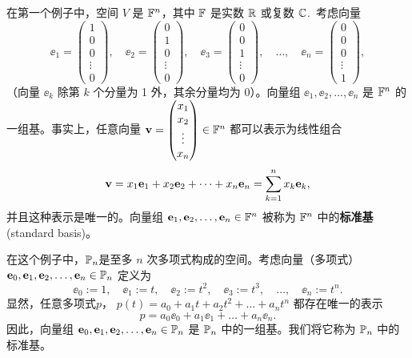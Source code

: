 \begin{example}\label{stmt:01-02-02}
在第一个例子中，空间 ${V}$ 是 $\mathbb{F}^n$，其中 $\mathbb{F}$ 是实数 $\mathbb{R}$ 或复数 $\mathbb{C}$.~考虑向量
$$ \ee_1 = \begin{pmatrix} 1 \\ 0 \\ 0 \\ \vdots \\ 0 \end{pmatrix}, \quad \ee_2 = \begin{pmatrix} 0 \\ 1 \\ 0 \\ \vdots \\ 0 \end{pmatrix}, \quad \ee_3 = \begin{pmatrix} 0 \\ 0 \\ 1 \\ \vdots \\ 0 \end{pmatrix}, \quad \dots, \quad \ee_n = \begin{pmatrix} 0 \\ 0 \\ 0 \\ \vdots \\ 1 \end{pmatrix} ,$$
（向量 $\ee_k$ 除第 $k$ 个分量为 1 外，其余分量均为 0）。向量组 $\ee_1, \ee_2, \dots, \ee_n$ 是 $\mathbb{F}^n$ 的一组基。事实上，任意向量 $\mathbf{v} = \begin{pmatrix} x_1 \\ x_2 \\ \vdots \\ x_n \end{pmatrix} \in \mathbb{F}^n$ 都可以表示为线性组合
$$ \mathbf{v} = x_1 \mathbf{e}_1 + x_2 \mathbf{e}_2 + \dots + x_n \mathbf{e}_n = \sum_{k=1}^n x_k \mathbf{e}_k ,$$
并且这种表示是唯一的。向量组 $\mathbf{e}_1, \mathbf{e}_2, \dots, \mathbf{e}_n \in \mathbb{F}^n$ 被称为 $\mathbb{F}^n$ 中的\textbf{标准基}(standard basis)。
\end{example}


\begin{example}\label{stmt:01-02-03}
在这个例子中，$\mathbb{P}_n$是至多 $n$ 次多项式构成的空间。考虑向量（多项式） $\mathbf{e}_0, \mathbf{e}_1, \mathbf{e}_2, \dots, \mathbf{e}_n \in \mathbb{P}_n$ 定义为
$$ \ee_0 := 1, \quad \ee_1 := t, \quad \ee_2 := t^2, \quad \ee_3 := t^3, \quad \dots, \quad \ee_n := t^n .$$
显然，任意多项式$p$， $p(t) = a_0 + a_1 t + a_2 t^2 + \dots + a_n t^n$ 都存在唯一的表示
$$ p = a_0 \ee_0 + a_1 \ee_1 + \dots + a_n \ee_n .$$
因此，向量组 $\mathbf{e}_0, \mathbf{e}_1, \mathbf{e}_2, \dots, \mathbf{e}_n \in \mathbb{P}_n$ 是 $\mathbb{P}_n$ 中的一组基。我们将它称为 $\mathbb{P}_n$ 中的标准基。
\end{example}

